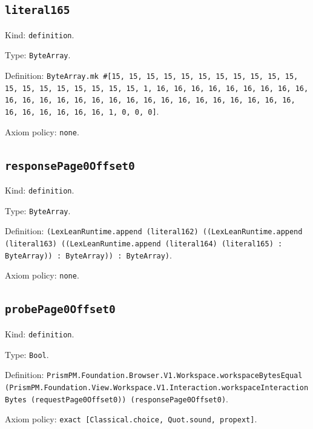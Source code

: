 \documentclass[11pt]{article}
\begin{document}
\subsection*{\texttt{literal165}}
\noindent Kind: \texttt{definition}.\par
\noindent Type: \texttt{ByteArray}.\par
\noindent Definition: \texttt{ByteArray.mk \#[15, 15, 15, 15, 15, 15, 15, 15, 15, 15, 15, 15, 15, 15, 15, 15, 15, 15, 15, 1, 16, 16, 16, 16, 16, 16, 16, 16, 16, 16, 16, 16, 16, 16, 16, 16, 16, 16, 16, 16, 16, 16, 16, 16, 16, 16, 16, 16, 16, 16, 16, 16, 1, 0, 0, 0]}.\par
\noindent Axiom policy: \texttt{none}.\par
\subsection*{\texttt{responsePage0Offset0}}
\noindent Kind: \texttt{definition}.\par
\noindent Type: \texttt{ByteArray}.\par
\noindent Definition: \texttt{(LexLeanRuntime.append (literal162) ((LexLeanRuntime.append (literal163) ((LexLeanRuntime.append (literal164) (literal165) : ByteArray)) : ByteArray)) : ByteArray)}.\par
\noindent Axiom policy: \texttt{none}.\par
\subsection*{\texttt{probePage0Offset0}}
\noindent Kind: \texttt{definition}.\par
\noindent Type: \texttt{Bool}.\par
\noindent Definition: \texttt{PrismPM.Foundation.Browser.V1.Workspace.workspaceBytesEqual (PrismPM.Foundation.View.Workspace.V1.Interaction.workspaceInteractionBytes (requestPage0Offset0)) (responsePage0Offset0)}.\par
\noindent Axiom policy: \texttt{exact [Classical.choice, Quot.sound, propext]}.\par
\end{document}
